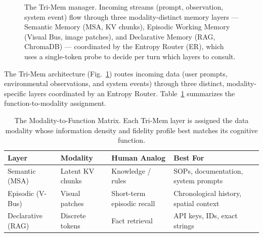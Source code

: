 \documentclass[conference]{IEEEtran}
\begin{document}
\begin{figure}[t]
{%
    }
    \caption{The Tri-Mem manager. Incoming streams (prompt, observation, system event) flow through three modality-distinct memory layers --- Semantic Memory (MSA, KV chunks), Episodic Working Memory (Visual Bus, image patches), and Declarative Memory (RAG, ChromaDB) --- coordinated by the Entropy Router (ER), which uses a single-token probe to decide per turn which layers to consult.}
    \label{fig:architecture}
\end{figure}

The Tri-Mem architecture (Fig.~\ref{fig:architecture}) routes incoming data (user prompts, environmental observations, and system events) through three distinct, modality-specific layers coordinated by an Entropy Router. Table~\ref{tab:modality-matrix} summarizes the function-to-modality assignment.

\begin{table}[t]
    \centering
    \caption{The Modality-to-Function Matrix. Each Tri-Mem layer is assigned the data modality whose information density and fidelity profile best matches its cognitive function.}
    \label{tab:modality-matrix}
    \footnotesize
    \begin{tabularx}{\columnwidth}{@{} l l >{\raggedright\arraybackslash}X >{\raggedright\arraybackslash}X @{}}
        \toprule
        \textbf{Layer}    & \textbf{Modality} & \textbf{Human Analog}      & \textbf{Best For}                      \\
        \midrule
        Semantic (MSA)    & Latent KV chunks  & Knowledge / rules          & SOPs, documentation, system prompts    \\
        Episodic (V-Bus)  & Visual patches    & Short-term episodic recall & Chronological history, spatial context \\
        Declarative (RAG) & Discrete tokens   & Fact retrieval             & API keys, IDs, exact strings           \\
        \bottomrule
    \end{tabularx}
\end{table}
\end{document}
